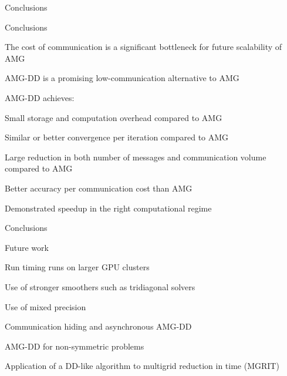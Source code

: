 \documentclass[18pt,xcolor=table]{beamer}
\begin{document}
\begin{frame}{Conclusions}
\begin{block}{Conclusions}
\bit
\item The cost of communication is a significant bottleneck for future scalability of AMG
\item AMG-DD is a promising low-communication alternative to AMG
\item AMG-DD achieves:
\bit
\item Small storage and computation overhead compared to AMG
\item Similar or better convergence per iteration compared to AMG
\item Large reduction in both number of messages and communication volume compared to AMG
\item Better accuracy per communication cost than AMG
\item Demonstrated speedup in the right computational regime
\eit
\eit
\end{block}
\end{frame}

\begin{frame}{Conclusions}
\begin{block}{Future work}
\bit
\item Run timing runs on larger GPU clusters
\item Use of stronger smoothers such as tridiagonal solvers
\item Use of mixed precision
\item Communication hiding and asynchronous AMG-DD
\item AMG-DD for non-symmetric problems
\item Application of a DD-like algorithm to multigrid reduction in time (MGRIT)
\eit
\end{block}
\end{frame}

\end{document}
